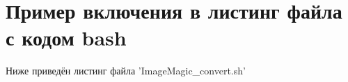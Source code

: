 \section{Пример включения в листинг файла с кодом bash}

Ниже приведён листинг файла 'ImageMagic\_convert.sh'
%
\inputminted[fontsize=\small, linenos, breaklines, numbersep=2mm, xleftmargin=5mm]{bash}{./about/bash/ImageMagic_convert.sh}
